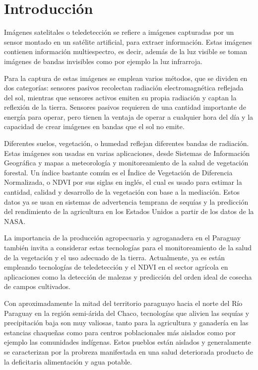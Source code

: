 \section{Introducción}

Imágenes satelitales o teledetección se refiere a imágenes capturadas por un sensor montado en un satélite artificial,
para extraer información. Estas imágenes contienen información multiespectro, es decir, además de la luz visible se
toman imágenes de bandas invisibles como por ejemplo la luz infrarroja. \autocite{globalforestlink-how-sat-imaging-work}

Para la captura de estas imágenes se emplean varios métodos, que se dividen en dos categorías: sensores pasivos
recolectan radiación electromagnética reflejada del sol, mientras que sensores activos emiten su propia radiación y
captan la reflexión de la tierra. Sensores pasivos requieren de una cantidad importante de energía para operar, pero
tienen la ventaja de operar a cualquier hora del día y la capacidad de crear imágenes en bandas que el sol no emite.
\autocite{globalforestlink-how-sat-imaging-work}

Diferentes suelos, vegetación, o humedad reflejan diferentes bandas de radiación. Estas imágenes son usadas en varias
aplicaciones, desde Sistemas de Información Geográfica y mapas a meteorología y monitoreamiento de la salud de
vegetación forestal. Un índice bastante común es el Índice de Vegetación de Diferencia Normalizada, o NDVI por sus
siglas en inglés, el cual es usado para estimar la cantidad, calidad y desarrollo de la vegetación con base a la
mediación. Estos datos ya se usan en sistemas de advertencia temprana de sequías y la predicción del rendimiento de la
agricultura en los Estados Unidos a partir de los datos de la NASA. \autocite{earthdata-vegetation}

La importancia de la producción agropecuaria y agroganadera en el Paraguay también invita a considerar estas
tecnologías para el monitoreamiento de la salud de la vegetación y el uso adecuado de la tierra. Actualmente, ya es
están empleando tecnologías de teledetección y el NDVI en el sector agrícola en aplicaciones como la detección de
malezas y predicción del orden ideal de cosecha de campos cultivados. \autocite{onesoil-agricultura-paraguay}

Con aproximadamente la mitad del territorio paraguayo hacia el norte del Río Paraguay en la región semi-árida del
Chaco, tecnologías que alivien las sequías y precipitación baja son muy valiosas, tanto para la agricultura y ganadería
en las estancias chaqueñas como para centros poblacionales más aislados como por ejemplo las comunidades indígenas.
Estos pueblos están aislados y generalamente se caracterizan por la probreza manifestada en una salud deteriorada
producto de la deficitaria alimentación y agua potable.

